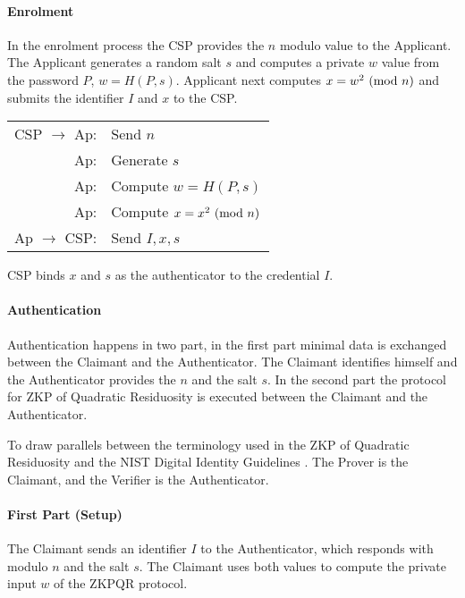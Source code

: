 \paragraph{Enrolment} In the enrolment process the CSP provides the $n$ modulo value to the Applicant.
The Applicant generates a random salt $s$ and computes a private $w$ value from the password $P$, $w = H(P, s)$.
Applicant next computes $x = w^2 \ (\mathrm{mod}\ n)$ and submits the identifier $I$ and $x$ to the CSP.

\bigskip

\begin{center}
\begin{tabular}{rl}
	CSP $\rightarrow$ Ap: & Send $n$\\
	Ap: & Generate $s$\\
	Ap: & Compute $w = H(P, s)$\\
	Ap: & Compute $x = x^2 \ (\mathrm{mod}\ n)$\\
	Ap $\rightarrow$ CSP: & Send $I, x, s$
\end{tabular}
\end{center}

\bigskip

CSP binds $x$ and $s$ as the authenticator to the credential $I$.

\paragraph{Authentication}

Authentication happens in two part, in the first part minimal data is exchanged between the Claimant and the Authenticator. The Claimant identifies himself and the Authenticator provides the $n$ and the salt $s$. %
In the second part the protocol for ZKP of Quadratic Residuosity is executed between the Claimant and the Authenticator. %

To draw parallels between the terminology used in the ZKP of Quadratic Residuosity \cite{GMR} and the NIST Digital Identity Guidelines \cite{grassi2017}. The Prover is the Claimant, and the Verifier is the Authenticator.

\bigskip

\paragraph{First Part (Setup)}

The Claimant sends an identifier $I$ to the Authenticator, which responds with modulo $n$ and the salt $s$. The Claimant uses both values to compute the private input $w$ of the ZKPQR protocol.

